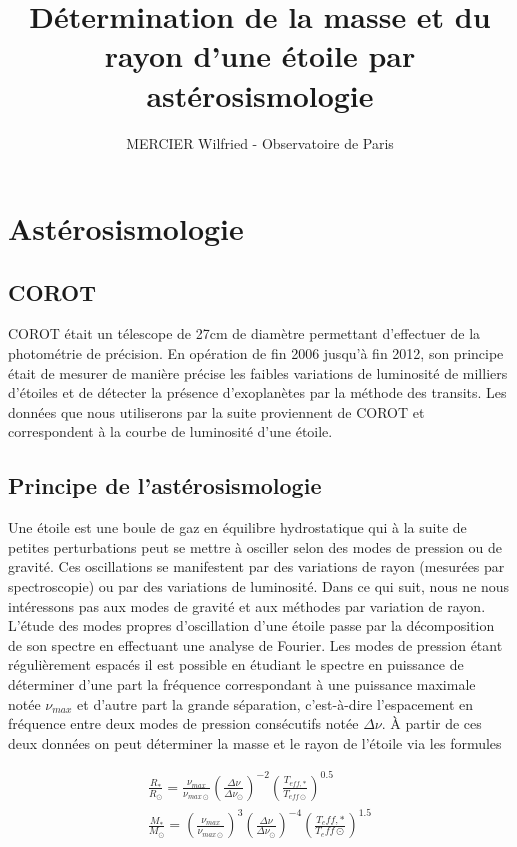 \documentclass[a4paper,11pt]{article}
\numberwithin{equation}{section}
\begin{document}
\title{\LARGE \bf Détermination de la masse et du rayon d'une étoile par astérosismologie}
\author{MERCIER Wilfried - Observatoire de Paris}
\maketitle


\section{Astérosismologie}
\subsection{COROT}
COROT était un télescope de 27cm de diamètre permettant d'effectuer de la photométrie de précision. En opération de fin 2006 jusqu'à fin 2012, son principe était de 
mesurer de manière précise les faibles variations de luminosité de milliers d'étoiles et de détecter la présence d'exoplanètes par la méthode des transits\cite{COROT}.\newline
Les données que nous utiliserons par la suite proviennent de COROT et correspondent à la courbe de luminosité d'une étoile.
\subsection{Principe de l'astérosismologie}
Une étoile est une boule de gaz en équilibre hydrostatique qui à la suite de petites perturbations peut se mettre à osciller selon des modes de pression ou
de gravité\cite{modes}. Ces oscillations se manifestent par des variations de rayon (mesurées par spectroscopie) ou par des variations de luminosité.\newline
Dans ce qui suit, nous ne nous intéressons pas aux modes de gravité et aux méthodes par variation de rayon.\newline
L'étude des modes propres d'oscillation d'une étoile passe par la décomposition de son spectre en effectuant une analyse de Fourier. Les modes de pression étant régulièrement
espacés il est possible en étudiant le spectre en puissance de déterminer d'une part la fréquence correspondant à une puissance maximale notée $ \nu_{max} $ et d'autre part
la grande séparation, c'est-à-dire l'espacement en fréquence entre deux modes de pression consécutifs notée $ \Delta \nu$. 
À partir de ces deux données on peut déterminer la masse et le rayon de l'étoile via les formules\cite{eqs}

\begin{gather}
\label{sismo}
\frac{R_{*}}{R_{\odot}} = \frac{\nu_{max}}{\nu_{max\odot}} \left (\frac{\Delta \nu}{\Delta \nu_{\odot}} \right )^{-2} \left ( \frac{T_{eff,*}}{T_{eff\odot}} \right )^{0.5} \\
\label{sismo2}
\frac{M_{*}}{M_{\odot}} = \left ( \frac{\nu_{max}}{\nu_{max\odot}} \right )^{3} \left ( \frac{\Delta \nu}{\Delta \nu_{\odot}} \right )^{-4} \left ( \frac{T_eff,*}{T_eff\odot} \right )^{1.5}
\end{gather}
\end{document}
